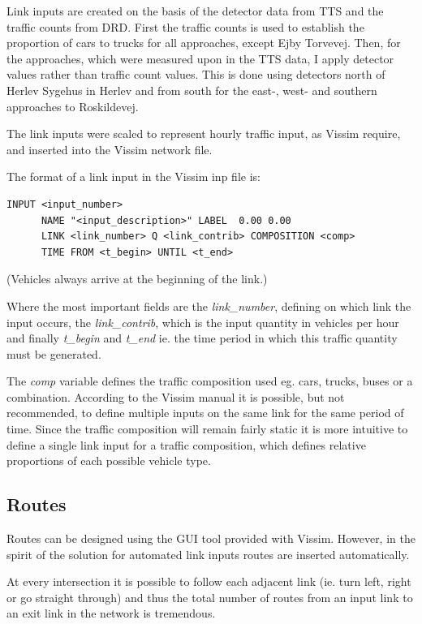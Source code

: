 Link inputs are created on the basis of the detector data from TTS and the traffic counts from DRD. First the traffic counts is used to establish the proportion of cars to trucks for all approaches, except Ejby Torvevej. Then, for the approaches, which were measured upon in the TTS data, I apply detector values rather than traffic count values. This is done using detectors north of Herlev Sygehus in Herlev and from south for the east-, west- and southern approaches to Roskildevej.

The link inputs were scaled to represent hourly traffic input, as Vissim require, and inserted into the Vissim network file.

The format of a link input in the Vissim inp file is:
\begin{verbatim}
INPUT <input_number>
      NAME "<input_description>" LABEL  0.00 0.00
      LINK <link_number> Q <link_contrib> COMPOSITION <comp>
      TIME FROM <t_begin> UNTIL <t_end>
\end{verbatim}

(Vehicles always arrive at the beginning of the link.)

Where the most important fields are the \textit{link\_number}, defining on which link the input occurs, the \textit{link\_contrib}, which is the input quantity in vehicles per hour and finally \textit{t\_begin} and \textit{t\_end} ie. the time period in which this traffic quantity must be generated.

The \textit{comp} variable defines the traffic composition used eg. cars, trucks, buses or a combination. According to the Vissim manual it is possible, but not recommended, to define multiple inputs on the same link for the same period of time. Since the traffic composition will remain fairly static it is more intuitive to define a single link input for a traffic composition, which defines relative proportions of each possible vehicle type.

\subsection{Routes}
\label{routefractions}
Routes can be designed using the GUI tool provided with Vissim. However, in the spirit of the solution for automated link inputs routes are inserted automatically. 

At every intersection it is possible to follow each adjacent link (ie. turn left, right or go straight through) and thus the total number of routes from an input link to an exit link in the network is tremendous.

